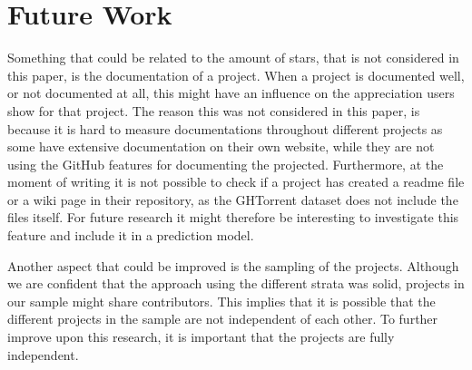 \section{Future Work}
Something that could be related to the amount of stars, that is not considered in this paper, is the documentation of a project.
When a project is documented well, or not documented at all, this might have an influence on the appreciation users show for that project.
The reason this was not considered in this paper, is because it is hard to measure documentations throughout different projects as some have extensive documentation on their own website, while they are not using the GitHub features for documenting the projected.
Furthermore, at the moment of writing it is not possible to check if a project has created a readme file or a wiki page in their repository, as the GHTorrent dataset does not include the files itself. For future research it might therefore be interesting to investigate this feature and include it in a prediction model.

Another aspect that could be improved is the sampling of the projects. 
Although we are confident that the approach using the different strata was solid, projects in our sample might share contributors. 
This implies that it is possible that the different projects in the sample are not independent of each other.
To further improve upon this research, it is important that the projects are fully independent.

